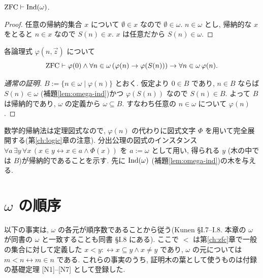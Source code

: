 \begin{lem}\label{lem:omega-ind}
  $\mathrm{ZFC} \vdash \mathrm{Ind}(\omega)$.
\end{lem}
\begin{proof}
  任意の帰納的集合 $x$ について $\emptyset \in x$ なので $\emptyset \in \omega$. $n \in \omega$ とし, 帰納的な $x$ をとると $n \in x$ なので $S(n) \in x$. $x$ は任意だから $S(n) \in \omega$.
\end{proof}

\begin{thm}[数学的帰納法]\label{thm:induction}
  各論理式 $\varphi(n, \vec z)$ について
  \[ \mathrm{ZFC} \vdash \varphi(0) \land \forall n \in \omega\,(\varphi(n) \to \varphi(S(n))) \to \forall n \in \omega\,\varphi(n). \]
\end{thm}
\begin{proof}[通常の証明]
  $B := \{n \in \omega \mid \varphi(n)\}$ とおく. 仮定より $0 \in B$ であり, $n \in B$ ならば $S(n) \in \omega$ (補題\ref{lem:omega-ind})かつ $\varphi(S(n))$ なので $S(n) \in B$. よって $B$ は帰納的であり, $\omega$ の定義から $\omega \subseteq B$. すなわち任意の $n \in \omega$ について $\varphi(n)$.
\end{proof}

数学的帰納法は定理図式なので, $\varphi(n)$ の代わりに図式文字 $\Phi$ を用いて完全展開する(第\ref{ch:logic}章の注意). 分出公理の図式のインスタンス $\forall a\,\exists y\,\forall x\,(x \in y \leftrightarrow x \in a \land \Phi(x))$ を $a := \omega$ として用い, 得られる $y$ (木の中では $B$)が帰納的であることを示す. 先に $\mathrm{Ind}(\omega)$ (補題\ref{lem:omega-ind})の木を与える.

\section{$\omega$ の順序}

以下の事実は, $\omega$ の各元が順序数であることから従う(Kunen \cite{kunen2011} \S I.7--I.8. 本章の $\omega$ が同書の $\omega$ と一致することも同書 \S I.8 にある). ここで $<$ は第\ref{ch:zfc}章で一般の集合に対して定義した $x < y :\leftrightarrow x \subseteq y \land x \neq y$ であり, $\omega$ の元については $m < n \leftrightarrow m \in n$ である. これらの事実のうち, 証明木の葉として使うものは付録の基礎定理 [N1]--[N7] として登録した.

